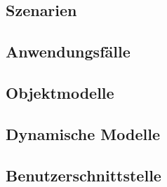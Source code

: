 \documentclass[parskip=full]{scrartcl}
\begin{document}
\subsection{Szenarien}

\subsection{Anwendungsfälle}

\subsection{Objektmodelle}

\subsection{Dynamische Modelle}

\subsection{Benutzerschnittstelle}
\end{document}
